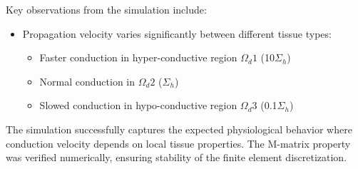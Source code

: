 \documentclass[12pt,a4paper]{article}
\begin{document}
Key observations from the simulation include:

\begin{itemize}
    \item Propagation velocity varies significantly between different tissue types:
    \begin{itemize}
        \item Faster conduction in hyper-conductive region $\Omega_d1$ (10$\Sigma_h$)
        \item Normal conduction in $\Omega_d2$ ($\Sigma_h$)
        \item Slowed conduction in hypo-conductive region $\Omega_d3$ (0.1$\Sigma_h$)
    \end{itemize}
\end{itemize}

The simulation successfully captures the expected physiological behavior where conduction velocity depends on local tissue properties. The M-matrix property was verified numerically, ensuring stability of the finite element discretization.
\end{document}
